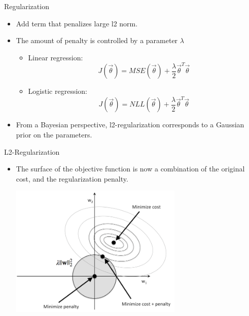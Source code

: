 \begin{vbframe}{Regularization}

\vfill

\begin{itemize}
\item Add term that penalizes large l2 norm.
\item The amount of penalty is controlled by a parameter $\lambda$
\begin{itemize}
 \item Linear regression:
 $$J(\vec\theta) = MSE(\vec\theta) + \frac{\lambda}{2}\vec{\theta}^T \vec{\theta}$$
 \item Logistic regression:
 $$J(\vec\theta) = NLL(\vec\theta) + \frac{\lambda}{2}\vec{\theta}^T \vec{\theta}$$
\end{itemize}
\item From a Bayesian perspective, l2-regularization corresponds to a Gaussian prior on the parameters.
\end{itemize}


\vfill

\end{vbframe}



\begin{vbframe}{L2-Regularization}

\vfill

\begin{itemize}
\item The surface of the objective function is now a combination of the original cost, and the regularization penalty.
\begin{center}
\includegraphics[width = 0.65\textwidth]{./figure/l2_regularization}
\end{center}
\end{itemize}

\vfill

\end{vbframe}


